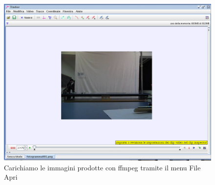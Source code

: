 \documentclass[a4paper,10pt,oneside]{article}
\begin{document}
\begin{figure}[H]
 \centering
 \includegraphics[width=\textwidth]{./immagini/tracker_caricamento_immagini1.png}
 \caption{Carichiamo le immagini prodotte con ffmpeg tramite il menu File \RIGHTarrow Apri}
 \label{fig:tracker_caricamento_immagini_1}
\end{figure}
\end{document}
